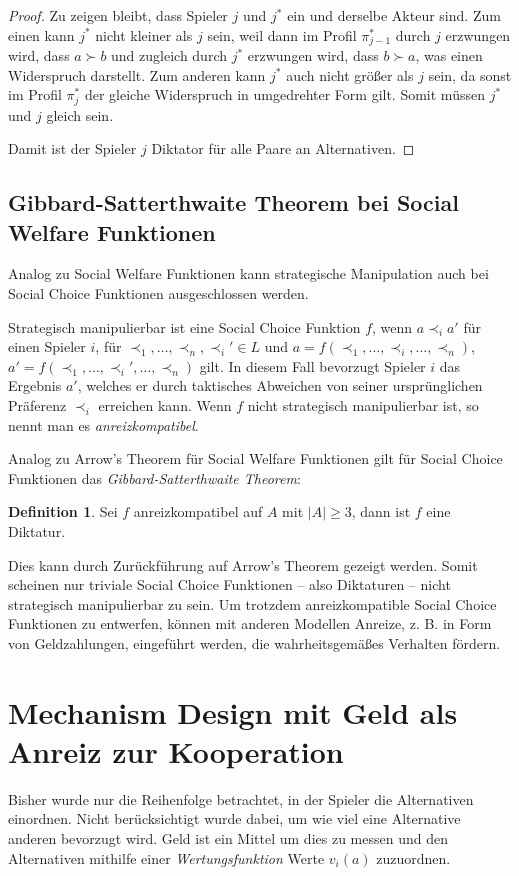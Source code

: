 \documentclass[a4paper,11pt]{article}
\theoremstyle{definition}
\newtheorem{definition}{Definition}
\theoremstyle{plain}
\theoremstyle{definition}
\begin{document}
\begin{proof}
	Zu zeigen bleibt, dass Spieler $j$ und $j^*$ ein und derselbe Akteur sind. 
	Zum einen kann $j^*$ nicht kleiner als $j$ sein, weil dann im Profil $\pi_{j-1}^*$ durch $j$ erzwungen wird, dass $a \succ b$ und zugleich durch $j^*$ erzwungen wird, dass $b \succ a$, was einen Widerspruch darstellt. 
	Zum anderen kann $j^*$ auch nicht größer als $j$ sein, da sonst im Profil $\pi_{j}^*$ der gleiche Widerspruch in umgedrehter Form gilt. Somit müssen $j^*$ und $j$ gleich sein.
	
	Damit ist der Spieler $j$ Diktator für alle Paare an Alternativen.
\end{proof}

\subsection{Gibbard-Satterthwaite Theorem bei Social Welfare Funktionen}
Analog zu Social Welfare Funktionen kann strategische Manipulation auch bei Social Choice Funktionen ausgeschlossen werden.

Strategisch manipulierbar ist eine Social Choice Funktion $f$, wenn $a \prec_i a'$ 
für einen Spieler $i$, für $\prec_1, \ldots, \prec_n, \prec_i' \in L$ und 
$a = f(\prec_1, \ldots, \prec_i, \ldots, \prec_n)$, 
$a' = f(\prec_1, \ldots, \prec_i', \ldots, \prec_n)$ gilt. 
In diesem Fall bevorzugt Spieler $i$ das Ergebnis $a'$, welches er durch taktisches Abweichen von seiner ursprünglichen Präferenz $\prec_i$ erreichen kann.
Wenn $f$ nicht strategisch manipulierbar ist, so nennt man es \emph{anreizkompatibel}.

Analog zu Arrow's Theorem für Social Welfare Funktionen gilt für Social Choice Funktionen das \emph{Gibbard-Satterthwaite Theorem}:

\begin{definition}
	\label{def:GibbSatt}
	Sei $f$ anreizkompatibel auf $A$ mit $|A| \geq 3$, dann ist $f$ eine Diktatur.
\end{definition}

Dies kann durch Zurückführung auf Arrow's Theorem gezeigt werden. Somit scheinen nur triviale Social Choice Funktionen -- also Diktaturen -- nicht strategisch manipulierbar zu sein. Um trotzdem anreizkompatible Social Choice Funktionen zu entwerfen, können mit anderen Modellen Anreize, {z. B.} in Form von Geldzahlungen, eingeführt werden, die wahrheitsgemäßes Verhalten fördern.

\section{Mechanism Design mit Geld als Anreiz zur Kooperation}
Bisher wurde nur die Reihenfolge betrachtet, in der Spieler die Alternativen einordnen. Nicht berücksichtigt wurde dabei, um wie viel eine Alternative anderen bevorzugt wird. Geld ist ein Mittel um dies zu messen und den Alternativen mithilfe einer \emph{Wertungsfunktion} Werte $v_i(a)$ zuzuordnen. 
\end{document}
